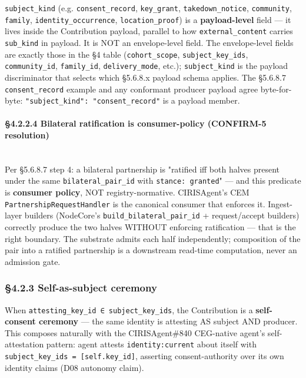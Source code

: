 \documentclass[10pt]{article}
\begin{document}
\texttt{subject\_kind} (e.g. \texttt{consent\_record}, \texttt{key\_grant}, \texttt{takedown\_notice}, \texttt{community}, \texttt{family}, \texttt{identity\_occurrence}, \texttt{location\_proof}) is a \textbf{payload-level} field — it lives inside the Contribution payload, parallel to how \texttt{external\_content} carries \texttt{sub\_kind} in payload. It is NOT an envelope-level field. The envelope-level fields are exactly those in the §4 table (\texttt{cohort\_scope}, \texttt{subject\_key\_ids}, \texttt{community\_id}, \texttt{family\_id}, \texttt{delivery\_mode}, etc.); \texttt{subject\_kind} is the payload discriminator that selects which §5.6.8.x payload schema applies. The §5.6.8.7 \texttt{consent\_record} example and any conformant producer payload agree byte-for-byte: \texttt{"subject\_kind": "consent\_record"} is a payload member.


\paragraph{§4.2.2.4 Bilateral ratification is consumer-policy (CONFIRM-5 resolution)}\mbox{}\\


Per §5.6.8.7 step 4: a bilateral partnership is "ratified iff both halves present under the same \texttt{bilateral\_pair\_id} with \texttt{stance: granted}" — and this predicate is \textbf{consumer policy}, NOT registry-normative. CIRISAgent's CEM \texttt{PartnershipRequestHandler} is the canonical consumer that enforces it. Ingest-layer builders (NodeCore's \texttt{build\_bilateral\_pair\_id} + request/accept builders) correctly produce the two halves WITHOUT enforcing ratification — that is the right boundary. The substrate admits each half independently; composition of the pair into a ratified partnership is a downstream read-time computation, never an admission gate.


\subsubsection*{§4.2.3 Self-as-subject ceremony}


When \texttt{attesting\_key\_id ∈ subject\_key\_ids}, the Contribution is a \textbf{self-consent ceremony} — the same identity is attesting AS subject AND producer. This composes naturally with the CIRISAgent\#840 CEG-native agent's self-attestation pattern: agent attests \texttt{identity:current} about itself with \texttt{subject\_key\_ids = [self.key\_id]}, asserting consent-authority over its own identity claims (D08 autonomy claim).
\end{document}
